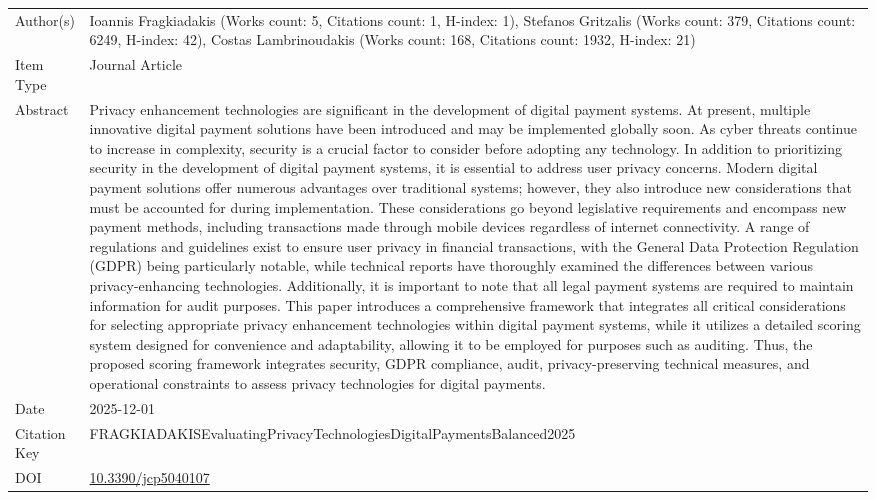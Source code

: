 \documentclass{article}
\begin{document}
\begin{enumerate}[label=\arabic*., font=\Large]
\begin{longtable}{p{} p{\contentcolwidth-2\tabcolsep}}
\toprule
Author(s) & Ioannis Fragkiadakis (Works count: 5, Citations count: 1, H-index: 1), Stefanos Gritzalis (Works count: 379, Citations count: 6249, H-index: 42), Costas Lambrinoudakis (Works count: 168, Citations count: 1932, H-index: 21) \\
Item Type & Journal Article \\
Abstract & Privacy enhancement technologies are significant in the development of digital payment systems. At present, multiple innovative digital payment solutions have been introduced and may be implemented globally soon. As cyber threats continue to increase in complexity, security is a crucial factor to consider before adopting any technology. In addition to prioritizing security in the development of digital payment systems, it is essential to address user privacy concerns. Modern digital payment solutions offer numerous advantages over traditional systems; however, they also introduce new considerations that must be accounted for during implementation. These considerations go beyond legislative requirements and encompass new payment methods, including transactions made through mobile devices regardless of internet connectivity. A range of regulations and guidelines exist to ensure user privacy in financial transactions, with the General Data Protection Regulation (GDPR) being particularly notable, while technical reports have thoroughly examined the differences between various privacy-enhancing technologies. Additionally, it is important to note that all legal payment systems are required to maintain information for audit purposes. This paper introduces a comprehensive framework that integrates all critical considerations for selecting appropriate privacy enhancement technologies within digital payment systems, while it utilizes a detailed scoring system designed for convenience and adaptability, allowing it to be employed for purposes such as auditing. Thus, the proposed scoring framework integrates security, GDPR compliance, audit, privacy-preserving technical measures, and operational constraints to assess privacy technologies for digital payments. \\
Date & 2025-12-01 \\
Citation Key & FRAGKIADAKISEvaluatingPrivacyTechnologiesDigitalPaymentsBalanced2025 \\
DOI & \href{http://doi.org/10.3390/jcp5040107}{10.3390/jcp5040107} \\

\end{longtable}
\end{enumerate}
\end{document}
